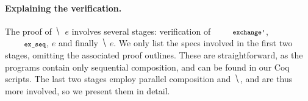
\paragraph{Explaining the verification.}
%
The proof of $\hide~~e$ involves several stages: verification of
$\esc{exchange'}$, $\esc{ex\_seq}$, $e$ and finally $\hide~e$. We only
list the specs involved in the first two stages, omitting the
associated proof outlines. These are straightforward, as the programs
contain only sequential composition, and can be found in our Coq
scripts. The last two stages employ parallel composition and $\hide$,
and are thus more involved, so we present them in detail.

